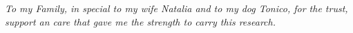 
\clearpage

\chapter*{}

\vfill

\vspace*{15cm}

\begin{flushright}
\textit{To my Family, in special to my wife Natalia and to my dog Tonico, for the trust, support an care that gave me the strength to carry this research.}
\end{flushright}

\vspace*{1cm}

\clearpage

